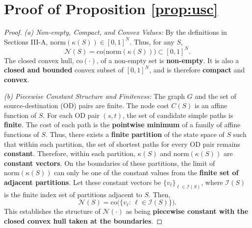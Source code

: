\documentclass{ccjnl}
\begin{document}
\section{Proof of Proposition \ref{prop:usc}}
\label{app:proof_prop_usc}
\begin{proof}
\textit{(a) Non-empty, Compact, and Convex Values:}
By the definitions in Sections III-A, $\mathrm{norm}(\kappa(S))\in[0,1]^N$. Thus, for any $S$,
\begin{equation}
\mathcal N(S)=\mathrm{co}\!\big(\mathrm{norm}(\kappa(S))\big)\subset[0,1]^N.
\end{equation}
The closed convex hull, $\mathrm{co}(\cdot)$, of a non-empty set is \textbf{non-empty}. It is also a \textbf{closed and bounded} convex subset of $[0,1]^N$, and is therefore \textbf{compact} and \textbf{convex}.

\textit{(b) Piecewise Constant Structure and Finiteness:}
The graph $G$ and the set of source-destination (OD) pairs are finite. The node cost $C(S)$ is an affine function of $S$. For each OD pair $(s,t)$, the set of candidate simple paths is \textbf{finite}. The cost of each path is the \textbf{pointwise minimum} of a family of affine functions of $S$. Thus, there exists a \textbf{finite partition} of the state space of $S$ such that within each partition, the set of shortest paths for every OD pair remains \textbf{constant}. Therefore, within each partition, $\kappa(S)$ and $\mathrm{norm}(\kappa(S))$ are \textbf{constant vectors}. On the boundaries of these partitions, the limit of $\mathrm{norm}(\kappa(S))$ can only be one of the constant values from the \textbf{finite set of adjacent partitions}. Let these constant vectors be $\{v_\ell\}_{\ell\in\mathcal I(S)}$, where $\mathcal I(S)$ is the finite index set of partitions adjacent to $S$. Then,
\begin{equation}
\mathcal N(S)=\mathrm{co}\big(\{v_\ell:\,\ell\in\mathcal I(S)\}\big).
\end{equation}
This establishes the structure of $\mathcal N(\cdot)$ as being \textbf{piecewise constant with the closed convex hull taken at the boundaries}.


\end{proof}
\end{document}
